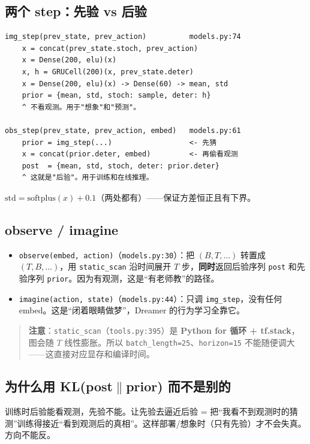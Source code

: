 \documentclass[11pt]{ctexart}
\begin{document}
\subsection{两个 step：先验 vs 后验}
\begin{Verbatim}[frame=single,fontsize=\small]
img_step(prev_state, prev_action)          models.py:74
    x = concat(prev_state.stoch, prev_action)
    x = Dense(200, elu)(x)
    x, h = GRUCell(200)(x, prev_state.deter)
    x = Dense(200, elu)(x) -> Dense(60) -> mean, std
    prior = {mean, std, stoch: sample, deter: h}
    ^ 不看观测。用于"想象"和"预测"。

obs_step(prev_state, prev_action, embed)   models.py:61
    prior = img_step(...)                  <- 先猜
    x = concat(prior.deter, embed)         <- 再偷看观测
    post  = {mean, std, stoch, deter: prior.deter}
    ^ 这就是"后验"。用于训练和在线推理。
\end{Verbatim}

$\mathrm{std} = \mathrm{softplus}(x) + 0.1$（两处都有）——保证方差恒正且有下界。

\subsection{observe / imagine}
\begin{itemize}
  \item \texttt{observe(embed, action)}（\texttt{models.py:30}）：把 $(B,T,\dots)$ 转置成 $(T,B,\dots)$，用 \texttt{static\_scan} 沿时间展开 $T$ 步，\textbf{同时}返回后验序列 \texttt{post} 和先验序列 \texttt{prior}。因为有观测，这是``有老师教''的路径。
  \item \texttt{imagine(action, state)}（\texttt{models.py:44}）：只调 \texttt{img\_step}，没有任何 embed。这是``闭着眼睛做梦''，Dreamer 的行为学习全靠它。
\end{itemize}

\begin{quote}
\textbf{注意}：\texttt{static\_scan}（\texttt{tools.py:395}）是 \textbf{Python for 循环 + tf.stack}，图会随 $T$ 线性膨胀。所以 \texttt{batch\_length=25}、\texttt{horizon=15} 不能随便调大——这直接对应显存和编译时间。
\end{quote}

\subsection{为什么用 KL(post$\|$prior) 而不是别的}
训练时后验能看观测，先验不能。让先验去逼近后验 = 把``我看不到观测时的猜测''训练得接近``看到观测后的真相''。这样部署/想象时（只有先验）才不会失真。方向不能反。
\end{document}
